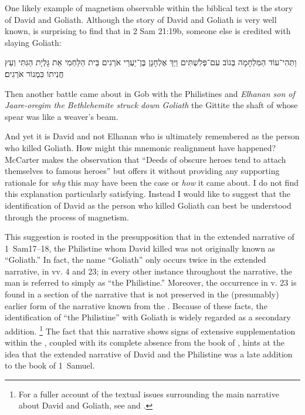 One likely example of magnetism observable within the biblical text is the story of David and Goliath. Although the story of David and Goliath is very well known, is surprising to find that in 2 Sam 21:19b, someone else is credited with slaying Goliath:
\begin{hebrewtext}
    וַתְּהִי־עוֹד הַמִּלְחָמָה בְּגוֹב עִם־פְּלִשְׁתִּים וַיַּךְ אֶלְחָנָן בֶּן־יַעְרֵי אֹרְגִים בֵּית הַלַּחְמִי אֵת גָּלְיָת הַגִּתִּי וְעֵץ חֲנִיתוֹ כִּמְנוֹר אֹרְגִים׃
\end{hebrewtext}
\begin{translation}
    Then another battle came about in Gob with the Philistines and \emph{Elhanan son of Jaare-oregim the Bethlehemite struck down Goliath} the Gittite the shaft of whose spear was like a weaver's beam.
\end{translation}
\noindent
And yet it is David and not Elhanan who is ultimately remembered as the person who killed Goliath. How might this mnemonic realignment have happened? McCarter makes the observation that ``Deeds of obscure heroes tend to attach themselves to famous heroes''%
    \autocite[450]{mccarter1984}
but offers it without providing any supporting rationale for \emph{why} this may have been the case or \emph{how} it came about. I do not find this explanation particularly satisfying. Instead I would like to suggest that the identification of David as the person who killed Goliath can best be understood through the process of magnetism.

This suggestion is rooted in the presupposition that in the extended narrative of 1~Sam17--18, the Philistine whom David killed was not originally known as ``Goliath.'' In fact, the name ``Goliath'' only occurs twice in the extended narrative, in vv. 4 and 23; in every other instance throughout the narrative, the man is referred to simply as ``the Philistine.'' Moreover, the occurrence in v. 23 is found in a section of the narrative that is not preserved in the (presumably) earlier form of the narrative known from the \lxx. Because of these facts, the identification of ``the Philistine'' with Goliath is widely regarded as a secondary addition.%
    \footnote{For a fuller account of the textual issues surrounding the main narrative about David and Goliath, see \cite[280--309]{mccarter1980} and \cite[69--77]{mckenzie2000}.}
The fact that this narrative shows signs of extensive supplementation within the \mt, coupled with its complete absence from the book of \chronicles, hints at the idea that the extended narrative of David and the Philistine was a late addition to the book of 1~Samuel.%

